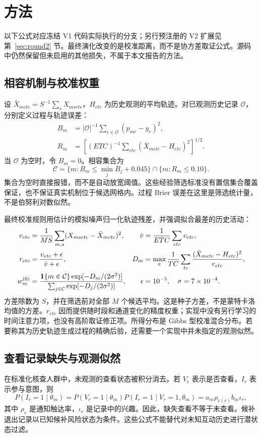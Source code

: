 \section{方法}
\label{sec:method}
以下公式对应冻结 V1 代码实际执行的分支；另行预注册的 V2 扩展见第~\ref{sec:round2} 节。最终演化改变的是校准距离，而不是协方差取证公式。源码中仍然保留但未启用的其他损失，不属于本文报告的方法。

\subsection{相容机制与校准权重}
设 $\bar X_{metc}=S^{-1}\sum_sX_{msetc}$，$H_{etc}$ 为历史观测的平均轨迹。对已观测历史记录 $\mathcal O$，分别定义过程与轨迹误差：
\begin{align}
 B_m&=|\mathcal O|^{-1}\sum_{r\in\mathcal O}(p_{mr}-y_r)^2,\nonumber\\
 R_m&=\left[(ETC)^{-1}\sum_{etc}(\bar X_{metc}-H_{etc})^2\right]^{1/2}.
 \label{eq:compaterrors}
\end{align}
当 $\mathcal O$ 为空时，令 $B_m=0$。相容集合为
\begin{equation}
 \mathcal C=\{m:B_m\leq\min_j B_j+0.045\}\cap\{m:R_m\leq0.10\}.
 \label{eq:set}
\end{equation}
集合为空时直接报错，而不是自动放宽阈值。这些经验筛选标准没有置信集合覆盖保证，也不保证真实机制位于候选网格内。过程 Brier 误差在这里是筛选统计量，不是伯努利对数似然。

最终校准规则用估计的模拟噪声归一化轨迹残差，并强调拟合最差的历史活动：
\begin{align}
 v_{etc}&=\frac1{MS}\sum_{m,s}(X_{msetc}-\bar X_{metc})^2,
 &\bar v&=\frac1{ETC}\sum_{etc}v_{etc},\nonumber\\
 r_{etc}&=\frac{v_{etc}+\epsilon}{\bar v+\epsilon},
 &D_m&=\max_e\frac1{TC}\sum_{tc}\frac{(\bar X_{metc}-H_{etc})^2}{r_{etc}},\label{eq:distance}\\
 w_m^{(0)}&=\frac{\mathbf{1}\{m\in\mathcal C\}\exp[-D_m/(2\sigma^2)]}
 {\sum_{j\in\mathcal C}\exp[-D_j/(2\sigma^2)]},
 &\epsilon&=10^{-5},\quad\sigma=7\times10^{-4}.\label{eq:weights}
\end{align}
方差除数为 $S$，并在筛选前对全部 $M$ 个候选平均。这是种子方差，不是蒙特卡洛均值的方差。$r_{etc}$ 因而提供随时段和通道变化的精度权重；实现中没有另行学习的时间注意力项，也没有高阶取证修正项。所得分布是 Gibbs 型校准混合分布。若要称其为历史轨迹生成过程的精确后验，还需要一个实现中并未指定的观测似然。

\subsection{查看记录缺失与观测似然}
在标准化核查人群中，未观测的查看状态被积分消去。若 $V_r$ 表示是否查看，$I_r$ 表示参与意图，则
\begin{equation}
 P(I_r=1\mid\theta_m)=P(V_r=1\mid\theta_m)P(I_r=1\mid V_r=1,\theta_m)
 =a_m\rho_{e(r)}b_m\iota_r,
 \label{eq:view}
\end{equation}
其中 $\rho_e$ 是通知触达率，$\iota_r$ 是记录中的兴趣。因此，缺失查看不等于未查看。候补退出记录以已知候补风险状态为条件。这些公式不能替代对未知互动历史进行潜状态过滤。

